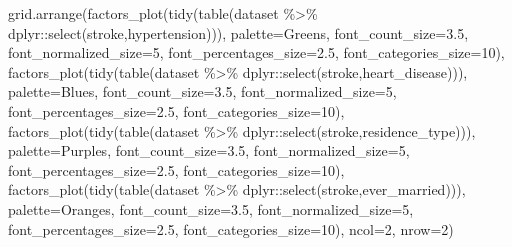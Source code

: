 \documentclass[
]{article}
\newenvironment{Shaded}{\begin{snugshade}}{\end{snugshade}}
\newcommand{\AttributeTok}[1]{\textcolor[rgb]{0.77,0.63,0.00}{#1}}
\newcommand{\DecValTok}[1]{\textcolor[rgb]{0.00,0.00,0.81}{#1}}
\newcommand{\FloatTok}[1]{\textcolor[rgb]{0.00,0.00,0.81}{#1}}
\newcommand{\FunctionTok}[1]{\textcolor[rgb]{0.00,0.00,0.00}{#1}}
\newcommand{\NormalTok}[1]{#1}
\newcommand{\SpecialCharTok}[1]{\textcolor[rgb]{0.00,0.00,0.00}{#1}}
\newcommand{\StringTok}[1]{\textcolor[rgb]{0.31,0.60,0.02}{#1}}
\begin{document}
\begin{Shaded}
\begin{Highlighting}[]
\FunctionTok{grid.arrange}\NormalTok{(}\FunctionTok{factors\_plot}\NormalTok{(}\FunctionTok{tidy}\NormalTok{(}\FunctionTok{table}\NormalTok{(dataset }\SpecialCharTok{\%\textgreater{}\%}\NormalTok{ dplyr}\SpecialCharTok{::}\FunctionTok{select}\NormalTok{(stroke,hypertension))), }\AttributeTok{palette=}\StringTok{\textquotesingle{}Greens\textquotesingle{}}\NormalTok{,}
                         \AttributeTok{font\_count\_size=}\FloatTok{3.5}\NormalTok{, }\AttributeTok{font\_normalized\_size=}\DecValTok{5}\NormalTok{, }\AttributeTok{font\_percentages\_size=}\FloatTok{2.5}\NormalTok{,}
                         \AttributeTok{font\_categories\_size=}\DecValTok{10}\NormalTok{), }
            \FunctionTok{factors\_plot}\NormalTok{(}\FunctionTok{tidy}\NormalTok{(}\FunctionTok{table}\NormalTok{(dataset }\SpecialCharTok{\%\textgreater{}\%}\NormalTok{ dplyr}\SpecialCharTok{::}\FunctionTok{select}\NormalTok{(stroke,heart\_disease))), }\AttributeTok{palette=}\StringTok{\textquotesingle{}Blues\textquotesingle{}}\NormalTok{,}
                         \AttributeTok{font\_count\_size=}\FloatTok{3.5}\NormalTok{, }\AttributeTok{font\_normalized\_size=}\DecValTok{5}\NormalTok{, }\AttributeTok{font\_percentages\_size=}\FloatTok{2.5}\NormalTok{,}
                         \AttributeTok{font\_categories\_size=}\DecValTok{10}\NormalTok{), }
            \FunctionTok{factors\_plot}\NormalTok{(}\FunctionTok{tidy}\NormalTok{(}\FunctionTok{table}\NormalTok{(dataset }\SpecialCharTok{\%\textgreater{}\%}\NormalTok{ dplyr}\SpecialCharTok{::}\FunctionTok{select}\NormalTok{(stroke,residence\_type))), }\AttributeTok{palette=}\StringTok{\textquotesingle{}Purples\textquotesingle{}}\NormalTok{,}
                         \AttributeTok{font\_count\_size=}\FloatTok{3.5}\NormalTok{, }\AttributeTok{font\_normalized\_size=}\DecValTok{5}\NormalTok{, }\AttributeTok{font\_percentages\_size=}\FloatTok{2.5}\NormalTok{,}
                         \AttributeTok{font\_categories\_size=}\DecValTok{10}\NormalTok{),}
            \FunctionTok{factors\_plot}\NormalTok{(}\FunctionTok{tidy}\NormalTok{(}\FunctionTok{table}\NormalTok{(dataset }\SpecialCharTok{\%\textgreater{}\%}\NormalTok{ dplyr}\SpecialCharTok{::}\FunctionTok{select}\NormalTok{(stroke,ever\_married))), }\AttributeTok{palette=}\StringTok{\textquotesingle{}Oranges\textquotesingle{}}\NormalTok{,}
                         \AttributeTok{font\_count\_size=}\FloatTok{3.5}\NormalTok{, }\AttributeTok{font\_normalized\_size=}\DecValTok{5}\NormalTok{, }\AttributeTok{font\_percentages\_size=}\FloatTok{2.5}\NormalTok{,}
                         \AttributeTok{font\_categories\_size=}\DecValTok{10}\NormalTok{),}
            \AttributeTok{ncol=}\DecValTok{2}\NormalTok{, }\AttributeTok{nrow=}\DecValTok{2}\NormalTok{)}
\end{Highlighting}
\end{Shaded}
\end{document}
